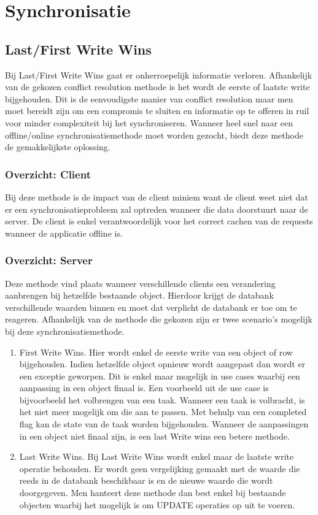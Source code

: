\section{Synchronisatie}
\subsection{Last/First Write Wins}
Bij Last/First Write Wins gaat er onherroepelijk informatie verloren. Afhankelijk van de gekozen conflict resolution methode is het wordt de eerste of laatste write bijgehouden. Dit is de eenvoudigste manier van conflict resolution maar men moet bereidt zijn om een compromis te sluiten en informatie op te offeren in ruil voor minder complexiteit bij het synchroniseren. Wanneer heel snel naar een offline/online synchronisatiemethode moet worden gezocht, biedt deze methode de gemakkelijkste oplossing.
\subsubsection{Overzicht: Client}
Bij deze methode is de impact van de client miniem want de client weet niet dat er een synchronisatieprobleem zal optreden wanneer die data doorstuurt naar de server. De client is enkel verantwoordelijk voor het correct cachen van de requests wanneer de applicatie offline is.
\subsubsection{Overzicht: Server}
Deze methode vind plaats wanneer verschillende clients een verandering aanbrengen bij hetzelfde bestaande object. Hierdoor krijgt de databank verschillende waarden binnen en moet dat verplicht de databank er toe om te reageren. Afhankelijk van de methode die gekozen zijn er twee scenario's mogelijk bij deze synchronisatiemethode.
\begin{enumerate}
\item First Write Wins. Hier wordt enkel de eerste write van een object of row bijgehouden. Indien hetzelfde object opnieuw wordt aangepast dan wordt er een exceptie geworpen. Dit is enkel maar mogelijk in use cases waarbij een aanpassing in een object finaal is. Een voorbeeld uit de use case is bijvoorbeeld het volbrengen van een taak. Wanneer een taak is volbracht, is het niet meer mogelijk om die aan te passen. Met behulp van een completed flag kan de state van de taak worden bijgehouden. Wanneer de aanpassingen in een object niet finaal zijn, is een last Write wins een betere methode.
\item Last Write Wins. Bij Last Write Wins wordt enkel maar de laatste write operatie behouden. Er wordt geen vergelijking gemaakt met de waarde die reeds in de databank beschikbaar is en de nieuwe waarde die wordt doorgegeven. Men hanteert deze methode dan best enkel bij bestaande objecten waarbij het mogelijk is om UPDATE operaties op uit te voeren.
\end{enumerate}
